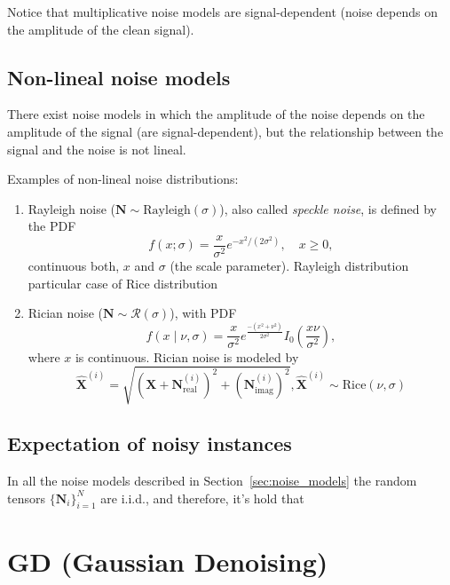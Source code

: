 \documentclass{article}
\begin{document}
Notice that multiplicative noise models are signal-dependent (noise depends
on the amplitude of the clean signal).

\subsection{Non-lineal noise models}

There exist noise models in which the amplitude of the noise depends
on the amplitude of the signal (are signal-dependent), but the
relationship between the signal and the noise is not lineal.

Examples of non-lineal noise distributions:

\begin{enumerate}
\item Rayleigh noise ($\mathbf{N}\sim\mathrm{Rayleigh}(\sigma)$),
  also called \emph{speckle noise}, is defined by the PDF
  \begin{equation}
    f(x; \sigma) = \frac{x}{\sigma^2} e^{-x^2/(2\sigma^2)}, \quad x \geq 0,
  \end{equation}
  continuous both, $x$ and $\sigma$ (the scale parameter). Rayleigh
  distribution particular case of Rice distribution
\item Rician noise ($\mathbf{N}\sim\mathcal{R}(\sigma)$), with PDF
  \begin{equation}
    f(x\mid\nu,\sigma) = \frac{x}{\sigma^2}e^{\frac{-(x^2+\nu^2)}{2\sigma^2}}I_0\left(\frac{x\nu}{\sigma^2}\right),
  \end{equation}
  where $x$ is continuous. Rician noise is modeled by
\begin{equation}
  \hat{\mathbf X}^{(i)} = \sqrt{ ({\mathbf X} + {\mathbf N}_{\text{real}}^{(i)})^2 + ({\mathbf N}_{\text{imag}}^{(i)})^2}, \hat{\mathbf X}^{(i)}\sim\text{Rice}(\nu,\sigma)
\end{equation}
\end{enumerate}


\subsection{Expectation of noisy instances}
In all the noise models described in Section~\ref{sec:noise_models}
the random tensors $\{{\mathbf N}_i\}_{i=1}^N$ are i.i.d., and therefore,
it's hold that





\section{GD (Gaussian Denoising)}
\end{document}
